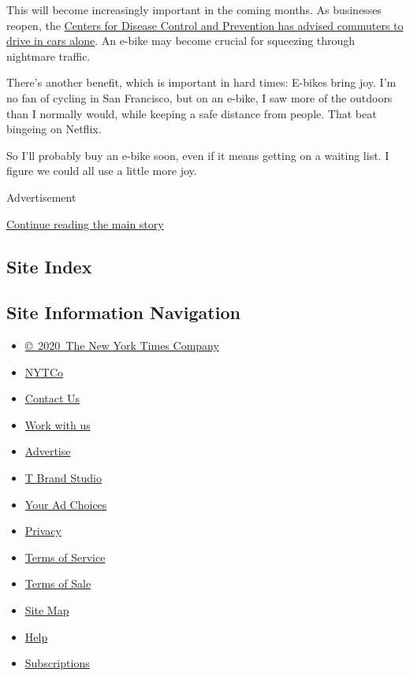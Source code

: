 This will become increasingly important in the coming months. As
businesses reopen, the
\href{https://www.nytimes.com/2020/05/28/health/cdc-coronavirus-offices.html}{Centers
for Disease Control and Prevention has advised commuters to drive in
cars alone}. An e-bike may become crucial for squeezing through
nightmare traffic.

There's another benefit, which is important in hard times: E-bikes bring
joy. I'm no fan of cycling in San Francisco, but on an e-bike, I saw
more of the outdoors than I normally would, while keeping a safe
distance from people. That beat bingeing on Netflix.

So I'll probably buy an e-bike soon, even if it means getting on a
waiting list. I figure we could all use a little more joy.

Advertisement

\protect\hyperlink{after-bottom}{Continue reading the main story}

\hypertarget{site-index}{%
\subsection{Site Index}\label{site-index}}

\hypertarget{site-information-navigation}{%
\subsection{Site Information
Navigation}\label{site-information-navigation}}

\begin{itemize}
\tightlist
\item
  \href{https://help.nytimes.com/hc/en-us/articles/115014792127-Copyright-notice}{©~2020~The
  New York Times Company}
\end{itemize}

\begin{itemize}
\tightlist
\item
  \href{https://www.nytco.com/}{NYTCo}
\item
  \href{https://help.nytimes.com/hc/en-us/articles/115015385887-Contact-Us}{Contact
  Us}
\item
  \href{https://www.nytco.com/careers/}{Work with us}
\item
  \href{https://nytmediakit.com/}{Advertise}
\item
  \href{http://www.tbrandstudio.com/}{T Brand Studio}
\item
  \href{https://www.nytimes.com/privacy/cookie-policy\#how-do-i-manage-trackers}{Your
  Ad Choices}
\item
  \href{https://www.nytimes.com/privacy}{Privacy}
\item
  \href{https://help.nytimes.com/hc/en-us/articles/115014893428-Terms-of-service}{Terms
  of Service}
\item
  \href{https://help.nytimes.com/hc/en-us/articles/115014893968-Terms-of-sale}{Terms
  of Sale}
\item
  \href{https://spiderbites.nytimes.com}{Site Map}
\item
  \href{https://help.nytimes.com/hc/en-us}{Help}
\item
  \href{https://www.nytimes.com/subscription?campaignId=37WXW}{Subscriptions}
\end{itemize}
